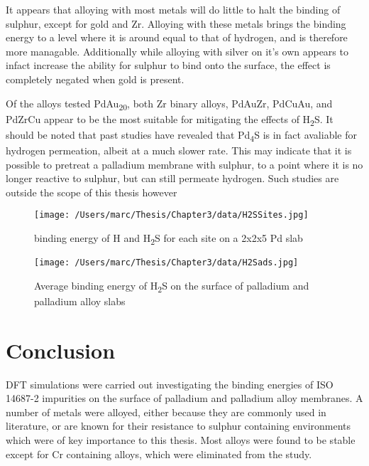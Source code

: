 It appears that alloying with most metals will do little to halt the binding of sulphur, except for gold and Zr. Alloying with these metals brings the binding energy to a level where it is around equal to that of hydrogen, and is therefore more managable. Additionally while alloying with silver on it's own appears to infact increase the ability for sulphur to bind onto the surface, the effect is completely negated when gold is present. 

Of the alloys tested PdAu\textsubscript{20}, both Zr binary alloys, PdAuZr, PdCuAu, and PdZrCu appear to be the most suitable for mitigating the effects of H\textsubscript{2}S. It should be noted that past studies have revealed that Pd\textsubscript{4}S is in fact avaliable for hydrogen permeation, albeit at a much slower rate.\cite{Morreale2007} This may indicate that it is possible to pretreat a palladium membrane with sulphur, to a point where it is no longer reactive to sulphur, but can still permeate hydrogen. Such studies are outside the scope of this thesis however

\begin{figure}
  \centering
  \texttt{[image: /Users/marc/Thesis/Chapter3/data/H2SSites.jpg]}
  \caption{binding energy of H and H\textsubscript{2}S for each site on a 2x2x5 Pd slab}
  \label{H2Ssite}
\end{figure}

\begin{landscape}

\begin{figure}
    \centering
    \texttt{[image: /Users/marc/Thesis/Chapter3/data/H2Sads.jpg]}
    \caption{Average binding energy of H\textsubscript{2}S on the surface of palladium and palladium alloy slabs}
    \label{h2sads}
  \end{figure}
\end{landscape}


\section{Conclusion}
DFT simulations were carried out investigating the binding energies of ISO 14687-2 impurities on the surface of palladium and palladium alloy membranes. A number of metals were alloyed, either because they are commonly used in literature, or are known for their resistance to sulphur containing environments which were of key importance to this thesis. Most alloys were found to be stable except for Cr containing alloys, which were eliminated from the study. 

